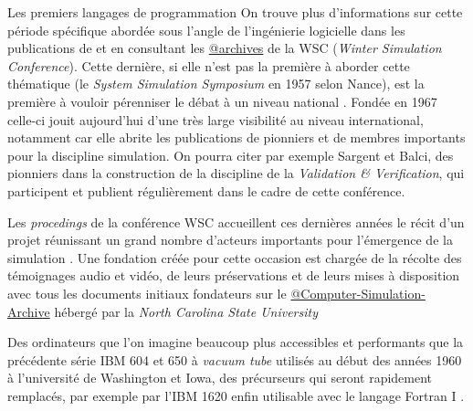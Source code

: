 \begin{testiv}{Les premiers langages de programmation}{}
On trouve plus d'informations sur cette période spécifique abordée sous l'angle de l'ingénierie logicielle dans les publications de \textcites{Nance2013,Nance1993, Araten1992, Nance2002} et en consultant les \href{http://informs-sim.org/}{@archives} de la WSC (\textit{Winter Simulation Conference}). Cette dernière, si elle n'est pas la première à aborder cette thématique (le \textit{System Simulation Symposium} en 1957 selon Nance), est la première à vouloir pérenniser le débat à un niveau national \autocite{Nance2002}. Fondée en 1967 \autocite{Crain1992, Araten1992} celle-ci jouit aujourd'hui d'une très large visibilité au niveau international, notamment car elle abrite les publications de pionniers et de membres importants pour la discipline simulation. On pourra citer par exemple Sargent et Balci, des pionniers dans la construction de la discipline de la \textit{Validation \& Verification}, qui participent et publient régulièrement dans le cadre de cette conférence. 

Les \textit{procedings} de la conférence WSC accueillent ces dernières années le récit d'un projet réunissant un grand nombre d'acteurs importants pour l'émergence de la simulation \autocite{Nance2013}. Une fondation créée pour cette occasion est chargée de la récolte des témoignages audio et vidéo, de leurs préservations et de leurs mises à disposition avec tous les documents initiaux fondateurs sur le \href{http://d.lib.ncsu.edu/computer-simulation/}{@Computer-Simulation-Archive} hébergé par la \textit{North Carolina State University}

\end{testiv}


Des ordinateurs que l'on imagine beaucoup plus accessibles et performants que la précédente série IBM 604 et 650  \autocite[584]{Barnes2004} à \textit{vacuum tube} utilisés au début des années 1960 à l'université de Washington  et Iowa, des précurseurs qui seront rapidement remplacés, par exemple par l'IBM 1620 enfin utilisable avec le langage Fortran I \autocite[66]{Berry2005}. 

